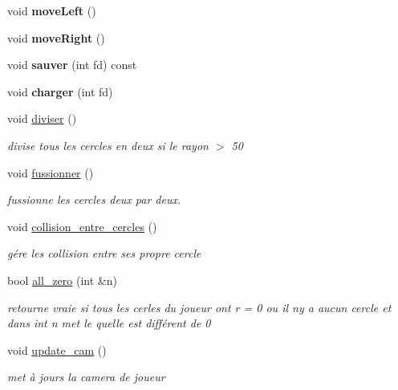 \begin{DoxyCompactItemize}
\mbox{\label{class_joueur_a804de1f48128371f5d8ee8c53efda5b7}} 
void {\bfseries move\+Left} ()
\item 
\mbox{\label{class_joueur_af5dc6b3ea32a0e5dec577ff8e872c6f1}} 
void {\bfseries move\+Right} ()
\item 
\mbox{\label{class_joueur_abd275928a3acfdcf3cbce0d91e6a1ed4}} 
void {\bfseries sauver} (int fd) const
\item 
\mbox{\label{class_joueur_afc0aed026c23c7da4e109bc865769e4b}} 
void {\bfseries charger} (int fd)
\item 
\mbox{\label{class_joueur_aa4e3150791b3a072a894e83ad423aa59}} 
void \mbox{\hyperlink{class_joueur_aa4e3150791b3a072a894e83ad423aa59}{diviser}} ()
\begin{DoxyCompactList}\small\item\em divise tous les cercles en deux si le rayon $>$ 50 \end{DoxyCompactList}\item 
\mbox{\label{class_joueur_ae1ac0277d6bc778a594290ac8ddbda2e}} 
void \mbox{\hyperlink{class_joueur_ae1ac0277d6bc778a594290ac8ddbda2e}{fussionner}} ()
\begin{DoxyCompactList}\small\item\em fussionne les cercles deux par deux. \end{DoxyCompactList}\item 
void \mbox{\hyperlink{class_joueur_ab37bf9dea93f89ed59a8103aa9a4ec00}{collision\+\_\+entre\+\_\+cercles}} ()
\begin{DoxyCompactList}\small\item\em gére les collision entre ses propre cercle \end{DoxyCompactList}\item 
\mbox{\label{class_joueur_a00f152a998b74e4af04a0637fd8523e7}} 
bool \mbox{\hyperlink{class_joueur_a00f152a998b74e4af04a0637fd8523e7}{all\+\_\+zero}} (int \&n)
\begin{DoxyCompactList}\small\item\em retourne vraie si tous les cerles du joueur ont r = 0 ou il n\textquotesingle{}y a aucun cercle et dans int n met le quelle est différent de 0 \end{DoxyCompactList}\item 
\mbox{\label{class_joueur_a8a9d40530e242a8b7b039d93005dba63}} 
void \mbox{\hyperlink{class_joueur_a8a9d40530e242a8b7b039d93005dba63}{update\+\_\+cam}} ()
\begin{DoxyCompactList}\small\item\em met à jours la camera de joueur \end{DoxyCompactList}\end{DoxyCompactItemize}

